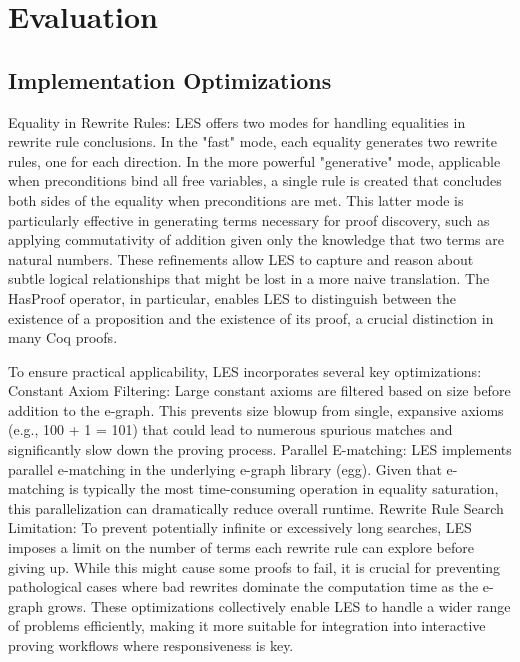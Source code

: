 \section{Evaluation}
\label{les:eval}



\subsection{Implementation Optimizations}

Equality in Rewrite Rules: LES offers two modes for handling equalities in rewrite rule conclusions. In the "fast" mode, each equality generates two rewrite rules, one for each direction. In the more powerful "generative" mode, applicable when preconditions bind all free variables, a single rule is created that concludes both sides of the equality when preconditions are met. This latter mode is particularly effective in generating terms necessary for proof discovery, such as applying commutativity of addition given only the knowledge that two terms are natural numbers.
These refinements allow LES to capture and reason about subtle logical relationships that might be lost in a more naive translation. The HasProof operator, in particular, enables LES to distinguish between the existence of a proposition and the existence of its proof, a crucial distinction in many Coq proofs.

To ensure practical applicability, LES incorporates several key optimizations:
Constant Axiom Filtering: Large constant axioms are filtered based on size before addition to the e-graph. This prevents size blowup from single, expansive axioms (e.g., 100 + 1 = 101) that could lead to numerous spurious matches and significantly slow down the proving process.
Parallel E-matching: LES implements parallel e-matching in the underlying e-graph library (egg). Given that e-matching is typically the most time-consuming operation in equality saturation, this parallelization can dramatically reduce overall runtime.
Rewrite Rule Search Limitation: To prevent potentially infinite or excessively long searches, LES imposes a limit on the number of terms each rewrite rule can explore before giving up. While this might cause some proofs to fail, it is crucial for preventing pathological cases where bad rewrites dominate the computation time as the e-graph grows.
These optimizations collectively enable LES to handle a wider range of problems efficiently, making it more suitable for integration into interactive proving workflows where responsiveness is key.
